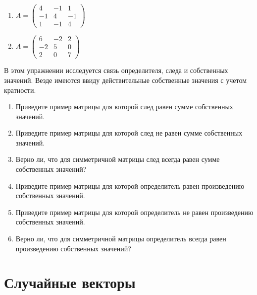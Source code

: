 \documentclass[pdftex,11pt,openany]{book}\usepackage[]{graphicx}\usepackage[]{color}
\begin{document}
\begin{problem}
\begin{enumerate}
\item $A=\begin{pmatrix}
4 & -1 & 1 \\
-1 & 4 & -1 \\
1 & -1 & 4
\end{pmatrix}$ 

\item $A=\begin{pmatrix}
6 & -2 & 2 \\
-2 & 5 & 0 \\
2 & 0 & 7
\end{pmatrix}$ 
\end{enumerate}
\end{problem}

\begin{solution}
\end{solution}


\begin{problem}
В этом упражнении исследуется связь определителя, следа и собственных значений. Везде имеются ввиду действительные собственные значения с учетом кратности.
\begin{enumerate}
\item Приведите пример матрицы для которой след равен сумме собственных значений.  
\item Приведите пример матрицы для которой след не равен сумме собственных значений. 
\item Верно ли, что для симметричной матрицы след всегда равен сумме собственных значений? 
\item Приведите пример матрицы для которой определитель равен произведению собственных значений.  
\item Приведите пример матрицы для которой определитель не равен произведению собственных значений. 
\item Верно ли, что для симметричной матрицы определитель всегда равен произведению собственных значений? 
\end{enumerate}
\end{problem}

\begin{solution}
\end{solution}


\chapter{Случайные векторы}
\end{document}
